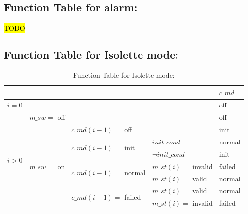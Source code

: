 \documentclass[fontsize=12pt,paper=letter,twoside]{scrartcl}
\begin{document}
\subsection{Function Table for alarm: }


\hl{TODO}
\subsection{Function Table for Isolette mode: }
\begin{table}[htb]
\centering
\begin{tabular}{llll|l|}
\cline{5-5}
                                                        &                                                  &                                                           &                    & $c\_md$  \\ \hline
\multicolumn{4}{|l|}{$i = 0$}                                                                                                                                                                 & off    \\ \hline
\multicolumn{1}{|l|}{\multirow{8}{*}{$i > 0$}} & \multicolumn{3}{l|}{$m\_sw =$ off}                                                                                                  & off    \\ \cline{2-5}
\multicolumn{1}{|l|}{}                                  & \multicolumn{1}{l|}{\multirow{7}{*}{$m\_sw =$ on}} & \multicolumn{2}{l|}{$c\_md(i-1) =$ off}                                          & init   \\ \cline{3-5}
\multicolumn{1}{|l|}{}                                  & \multicolumn{1}{l|}{}                            & \multicolumn{1}{l|}{\multirow{2}{*}{$c\_md(i-1) =$ init}}   & $init\_cond$ \footnotemark        & normal \\ \cline{4-5}
\multicolumn{1}{|l|}{}                                  & \multicolumn{1}{l|}{}                            & \multicolumn{1}{l|}{}                                     & $\neg init\_cond$     & init   \\ \cline{3-5}
\multicolumn{1}{|l|}{}                                  & \multicolumn{1}{l|}{}                            & \multicolumn{1}{l|}{\multirow{2}{*}{$c\_md(i-1) =$ normal}} & $m\_st(i) =$ invalid & failed   \\ \cline{4-5}
\multicolumn{1}{|l|}{}                                  & \multicolumn{1}{l|}{}                            & \multicolumn{1}{l|}{}                                     & $m\_st(i) =$ valid   & normal \\ \cline{3-5}
\multicolumn{1}{|l|}{}                                  & \multicolumn{1}{l|}{}                            & \multicolumn{1}{l|}{\multirow{2}{*}{$c\_md(i-1) =$ failed}}   & $m\_st(i) =$ valid   & normal \\ \cline{4-5}
\multicolumn{1}{|l|}{}                                  & \multicolumn{1}{l|}{}                            & \multicolumn{1}{l|}{}                                     & $m\_st(i) =$ invalid & failed   \\ \hline
\end{tabular}
\caption{Function Table for Isolette mode: }
\end{table}
\end{document}
